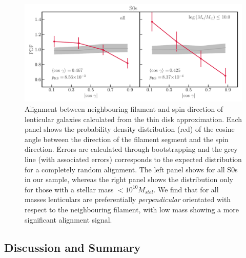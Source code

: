 \begin{figure}
    \centering
    \includegraphics[width=\linewidth]{thesis/latex/halo_assembly_manga/spin_fil_S0s_2in1.pdf}
    \caption{Alignment between neighbouring filament and spin direction of lenticular galaxies calculated from the thin disk approximation. Each panel shows the probability density distribution (red) of the cosine angle between the direction of the filament segment and the spin direction. Errors are calculated through bootstrapping and the grey line (with associated errors) corresponds to the expected distribution for a completely random alignment. The left panel shows for all S0s in our sample, whereas the right panel shows the distribution only for those with a stellar mass $< 10^{10} M_{stel}$. We find that for all masses lenticulars are preferentially \textit{perpendicular} orientated with respect to the neighbouring filament, with low mass showing a more significant alignment signal.}
    \label{fig:s0_spin_alignment}
\end{figure}

\subsection{Discussion and Summary}

